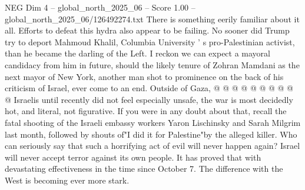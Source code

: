 \begin{textsample}{NEG Dim 4 – global\_north\_2025\_06 – Score 1.00 – global\_north\_2025\_06/126492274.txt}
There is something eerily familiar about it all.
Efforts to defeat this hydra also appear to be failing.
No sooner did Trump try to deport Mahmoud Khalil, Columbia University ' s pro-Palestinian activist, than he became the darling of the Left.
I reckon we can expect a mayoral candidacy from him in future, should the likely tenure of Zohran Mamdani as the next mayor of New York, another man shot to prominence on the back of his criticism of Israel, ever come to an end.
Outside of Gaza, @ @ @ @ @ @ @ @ @ @ Israelis until recently did not feel especially unsafe, the war is most decidedly hot, and literal, not figurative.
If you were in any doubt about that, recall the fatal shooting of the Israeli embassy workers Yaron Lischinsky and Sarah Milgrim last month, followed by shouts of"I did it for Palestine"by the alleged killer.
Who can seriously say that such a horrifying act of evil will never happen again?
Israel will never accept terror against its own people.
It has proved that with devastating effectiveness in the time since October 7.
The difference with the West is becoming ever more stark.

\end{textsample}
